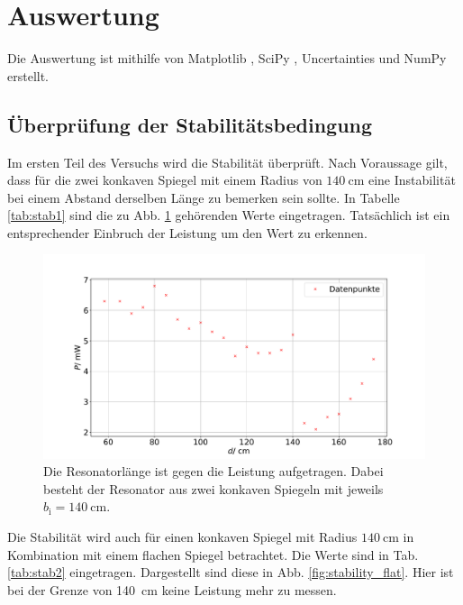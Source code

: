 \section{Auswertung}
\label{sec:Auswertung}
Die Auswertung ist mithilfe von Matplotlib \cite{matplotlib}, SciPy \cite{scipy}, Uncertainties \cite{uncertainties} und NumPy \cite{numpy} erstellt.

\subsection{Überprüfung der Stabilitätsbedingung}

Im ersten Teil des Versuchs wird die Stabilität überprüft. Nach Voraussage gilt, dass für die zwei konkaven Spiegel mit einem Radius von $\SI{140}{\centi\meter}$ eine Instabilität bei einem Abstand derselben Länge zu bemerken sein sollte. 
In Tabelle \ref{tab:stab1} sind die zu Abb. \ref{fig:stability140} gehörenden Werte eingetragen.
Tatsächlich ist ein entsprechender Einbruch der Leistung um den Wert zu erkennen. %



\begin{figure}
    \centering
    \includegraphics[width=\textwidth]{plots/stability140.pdf}
    \caption{Die Resonatorlänge ist gegen die Leistung aufgetragen. Dabei besteht der Resonator aus zwei konkaven Spiegeln mit jeweils $b_\text{i} = \SI{140}{\centi\meter}$.}
    \label{fig:stability140}
\end{figure} 

Die Stabilität wird auch für einen konkaven Spiegel mit Radius $\SI{140}{\centi\meter}$ in Kombination mit einem flachen Spiegel betrachtet. Die Werte sind in Tab. \ref{tab:stab2} eingetragen. Dargestellt sind diese in Abb. \ref{fig:stability_flat}.
Hier ist bei der Grenze von \SI{140}{\centi\meter} keine Leistung mehr zu messen.

